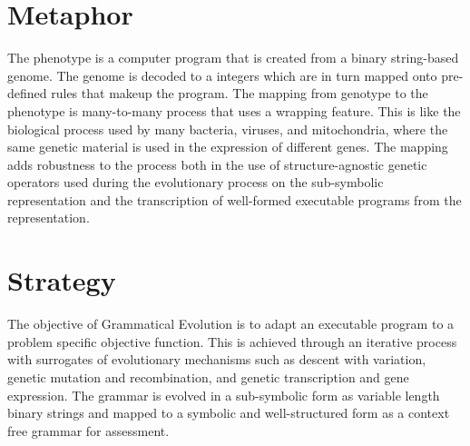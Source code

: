 \documentclass[a4paper, 11pt]{article}
\begin{document}
\section{Metaphor}
\label{sec:metaphor}
The phenotype is a computer program that is created from a binary string-based genome. The genome is decoded to a integers which are in turn mapped onto pre-defined rules that makeup the program. 
The mapping from genotype to the phenotype is many-to-many process that uses a wrapping feature. This is like the biological process used by many bacteria, viruses, and mitochondria, where the same genetic material is used in the expression of different genes.
The mapping adds robustness to the process both in the use of structure-agnostic genetic operators used during the evolutionary process on the sub-symbolic representation and the transcription of well-formed executable programs from the representation.

\section{Strategy}
\label{sec:strategy}
The objective of Grammatical Evolution is to adapt an executable program to a problem specific objective function.
This is achieved through an iterative process with surrogates of evolutionary mechanisms such as descent with variation, genetic mutation and recombination, and genetic transcription and gene expression. The grammar is evolved in a sub-symbolic form as variable length binary strings and mapped to a symbolic and well-structured form as a context free grammar for assessment.
\end{document}
